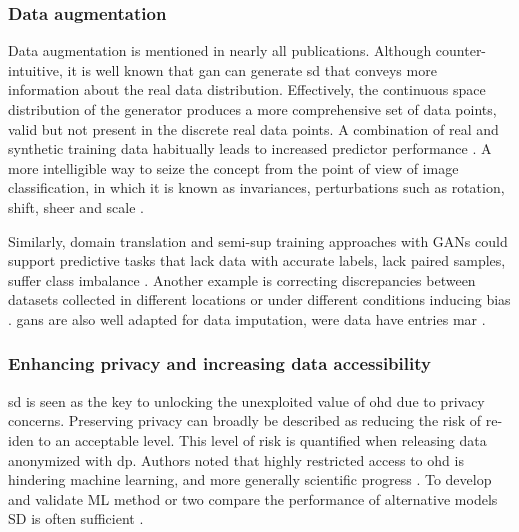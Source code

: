         \subsubsection{Data augmentation}\label{sec:augmentation}
    
            Data augmentation is mentioned in nearly all publications. Although counter-intuitive, it is well known that \gls{gan} can generate \gls{sd} that conveys more information about the real data distribution. Effectively, the continuous space distribution of the generator produces a more comprehensive set of data points, valid but not present in the discrete real data points. A combination of real and synthetic training data habitually leads to increased predictor performance \cite{Wang_2019,Che_2017,Yoon2018-ite, yoon2018imputation}. A more intelligible way to seize the concept from the point of view of image classification, in which it is known as invariances, perturbations such as rotation, shift, sheer and scale \cite{antoniou2017data}.\par 
            
            Similarly, domain translation and \gls{semi-sup} training approaches with \glspl{GAN} could support predictive tasks that lack data with accurate labels, lack paired samples, suffer class imbalance \cite{Che_2017,mcdermott2018semi}. Another example is correcting discrepancies between datasets collected in different locations or under different conditions inducing bias \cite{Yoon2018-radial}. \Glspl{gan} are also well adapted for data imputation, were data have entries \gls{mar} \cite{yoon2018imputation}. 

        \subsubsection{Enhancing privacy and increasing data accessibility}\label{sec:access_privacy}
    
            \gls{sd} is seen as the key to unlocking the unexploited value of \gls{ohd} due to privacy concerns. Preserving privacy can broadly be described as reducing the risk of \gls{re-iden} to an acceptable level. This level of risk is quantified when releasing data anonymized with \gls{dp}. Authors noted that highly restricted access to \gls{ohd} is hindering machine learning, and more generally scientific progress \cite{Beaulieu-Jones2019-ct, baowaly_2019_IEEE,baowaly_2019_jamia,Che_2017,esteban2017real,Fisher2019,severo2019ward2icu}. To develop and validate \gls{ML} method or two compare the performance of alternative models \gls{SD} is often sufficient \cite{Jordon2019}.\par
    
